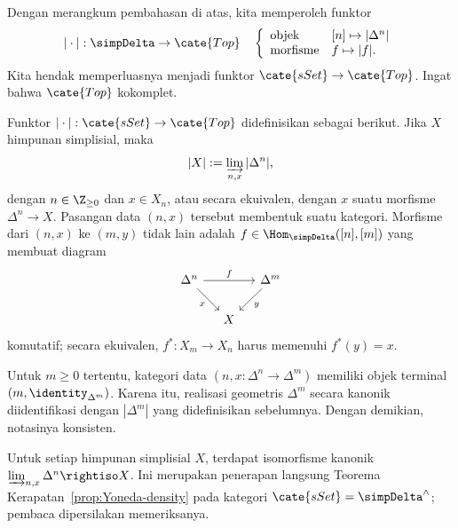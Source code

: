 Dengan merangkum pembahasan di atas, kita memperoleh funktor
\begin{equation*}
	|\cdot|: \simpDelta \to \cate{Top} \quad
	\left\{\begin{array}{ll}
		\text{objek} & [n] \mapsto |\Delta^n| \\
		\text{morfisme} & f \mapsto |f| .
	\end{array}\right.
\end{equation*}
Kita hendak memperluasnya menjadi funktor
$\cate{sSet}\to\cate{Top}$. Ingat bahwa $\cate{Top}$ kokomplet.

\begin{definition}
	Funktor $|\cdot|:\cate{sSet}\to\cate{Top}$ didefinisikan sebagai berikut.
	Jika $X$ himpunan simplisial, maka
	\[ |X| := \varinjlim_{n, x} |\Delta^n|, \]
	dengan $n\in\Z_{\geq0}$ dan $x\in X_n$, atau secara ekuivalen, dengan
	$x$ suatu morfisme $\Delta^n\to X$. Pasangan data $(n,x)$ tersebut membentuk suatu
	kategori. Morfisme dari $(n,x)$ ke $(m,y)$ tidak lain adalah
	$f\in\Hom_{\simpDelta}([n],[m])$ yang membuat diagram
	\[\begin{tikzcd}[column sep=small]
		\Delta^n \arrow[rr, "f"] \arrow[rd, "x"'] & & \Delta^m \arrow[ld, "y"] \\
		& X &
	\end{tikzcd}\]
	komutatif; secara ekuivalen, $f^*:X_m\to X_n$ harus memenuhi
	$f^*(y)=x$.
\end{definition}

Untuk $m\geq0$ tertentu, kategori data
$(n,x:\Delta^n\to\Delta^m)$ memiliki objek terminal
$(m,\identity_{\Delta^m})$. Karena itu, realisasi geometris $\Delta^m$
secara kanonik diidentifikasi dengan $|\Delta^m|$ yang didefinisikan
sebelumnya. Dengan demikian, notasinya konsisten.

\begin{remark}\label{rem:simplicial-density}
	Untuk setiap himpunan simplisial $X$, terdapat isomorfisme kanonik
	$\varinjlim_{n,x}\Delta^n\rightiso X$. Ini merupakan penerapan langsung
	Teorema Kerapatan~\ref{prop:Yoneda-density} pada kategori
	$\cate{sSet}=\simpDelta^{\wedge}$; pembaca dipersilakan memeriksanya.
\end{remark}

